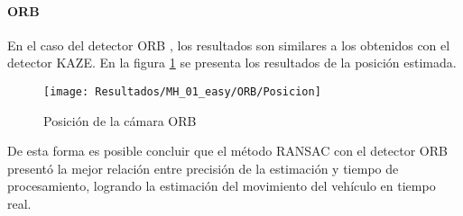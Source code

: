 \paragraph {ORB}

En el caso del detector ORB , los resultados son similares a los obtenidos con el detector KAZE. En la figura \ref{imagen:Resultados/MH_01_easy/ORB/Posicion} se presenta los resultados de la posición estimada.
	
\begin{figure}[H]
	\centering
	\texttt{[image: Resultados/MH\_01\_easy/ORB/Posicion]}
	\caption{Posición de la cámara ORB}
	\label{imagen:Resultados/MH_01_easy/ORB/Posicion}
\end{figure}

De esta forma es posible concluir que el método RANSAC con el detector ORB presentó la mejor relación entre precisión de la estimación y tiempo de procesamiento, logrando la estimación del movimiento del vehículo en tiempo real.



